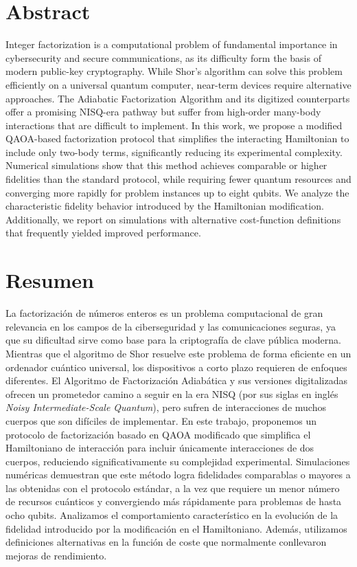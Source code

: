 \chapter*{Abstract}

Integer factorization is a computational problem of fundamental importance in cybersecurity and secure communications, as its difficulty form the basis of modern public-key cryptography. While Shor's algorithm can solve this problem efficiently on a universal quantum computer, near-term devices require alternative approaches. The Adiabatic Factorization Algorithm and its digitized counterparts offer a promising NISQ-era pathway but suffer from high-order many-body interactions that are difficult to implement. In this work, we propose a modified QAOA-based factorization protocol that simplifies the interacting Hamiltonian to include only two-body terms, significantly reducing its experimental complexity. Numerical simulations show that this method achieves comparable or higher fidelities than the standard protocol, while requiring fewer quantum resources and converging more rapidly for problem instances up to eight qubits. We analyze the characteristic fidelity behavior introduced by the Hamiltonian modification. Additionally, we report on simulations with alternative cost-function definitions that frequently yielded improved performance.

\chapter*{Resumen}

\noindent La factorización de números enteros es un problema computacional de gran relevancia en los campos de la ciberseguridad y las comunicaciones seguras, ya que su dificultad sirve como base para la criptografía de clave pública moderna. Mientras que el algoritmo de Shor resuelve este problema de forma eficiente en un ordenador cuántico universal, los dispositivos a corto plazo requieren de enfoques diferentes. El Algoritmo de Factorización Adiabática y sus versiones digitalizadas ofrecen un prometedor camino a seguir en la era NISQ (por sus siglas en inglés \textit{Noisy Intermediate-Scale Quantum}), pero sufren de interacciones de muchos cuerpos que son difíciles de implementar. En este trabajo, proponemos un protocolo de factorización basado en QAOA modificado que simplifica el Hamiltoniano de interacción para incluir únicamente interacciones de dos cuerpos, reduciendo significativamente su complejidad experimental. Simulaciones numéricas demuestran que este método logra fidelidades comparablas o mayores a las obtenidas con el protocolo estándar, a la vez que requiere un menor número de recursos cuánticos y convergiendo más rápidamente para problemas de hasta ocho qubits. Analizamos el comportamiento característico en la evolución de la fidelidad introducido por la modificación en el Hamiltoniano. Además, utilizamos definiciones alternativas en la función de coste que normalmente conllevaron mejoras de rendimiento.
